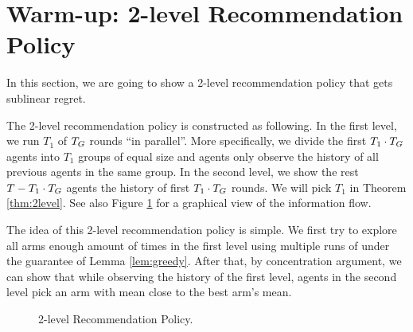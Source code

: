 \section{Warm-up: 2-level Recommendation Policy}
In this section, we are going to show a 2-level recommendation policy that gets sublinear regret.

The 2-level recommendation policy is constructed as following.
In the first level, we run $T_1$ \ALGG of $T_G$ rounds ``in parallel''. More specifically, we divide the first $T_1 \cdot T_G$ agents into $T_1$ groups of equal size and agents only observe the history of all previous agents in the same group.
In the second level, we show the rest $T-T_1\cdot T_G$ agents the history of first $T_1 \cdot T_G$ rounds. We will pick $T_1$ in Theorem \ref{thm:2level}. 
See also Figure \ref{fig:2level} for a graphical view of the information flow.

The idea of this 2-level recommendation policy is simple. We first try to explore all arms enough amount of times in the first level using multiple runs of \ALGG under the guarantee of Lemma \ref{lem:greedy}. After that, by concentration argument, we can show that while observing the history of the first level, agents in the second level pick an arm with mean close to the best arm's mean. 

\begin{figure}[H]
\centering
{}
\caption{2-level Recommendation Policy.}
\label{fig:2level}
\end{figure}

